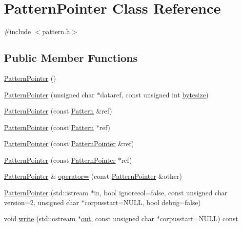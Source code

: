\hypertarget{classPatternPointer}{}\section{Pattern\+Pointer Class Reference}
\label{classPatternPointer}


{\ttfamily \#include $<$pattern.\+h$>$}

\subsection*{Public Member Functions}
\begin{DoxyCompactItemize}
\item 
\hyperlink{classPatternPointer_a381ac2ccc5d5f93a4455a1b2872d3d6e}{Pattern\+Pointer} ()
\item 
\hyperlink{classPatternPointer_aa647a834df48ed926690ddc19490d531}{Pattern\+Pointer} (unsigned char $\ast$dataref, const unsigned int \hyperlink{classPatternPointer_a8a204b408ed1cccc3b0c89183e818210}{bytesize})
\item 
\hyperlink{classPatternPointer_a8c1e78640412744a1f9411b937a4a6a5}{Pattern\+Pointer} (const \hyperlink{classPattern}{Pattern} \&ref)
\item 
\hyperlink{classPatternPointer_a5eb9e3fcab5a8551cdce0283fe944ea8}{Pattern\+Pointer} (const \hyperlink{classPattern}{Pattern} $\ast$ref)
\item 
\hyperlink{classPatternPointer_a39eb71907e688b7b459b56806d8053e4}{Pattern\+Pointer} (const \hyperlink{classPatternPointer}{Pattern\+Pointer} \&ref)
\item 
\hyperlink{classPatternPointer_a9aba9dd0c20350ae03814d962cd1dad3}{Pattern\+Pointer} (const \hyperlink{classPatternPointer}{Pattern\+Pointer} $\ast$ref)
\item 
\hyperlink{classPatternPointer}{Pattern\+Pointer} \& \hyperlink{classPatternPointer_a578fae25bee65ed0211a06f4101795f4}{operator=} (const \hyperlink{classPatternPointer}{Pattern\+Pointer} \&other)
\item 
\hyperlink{classPatternPointer_aa8eb02907db90afc9decd7b44e54b6c5}{Pattern\+Pointer} (std\+::istream $\ast$in, bool ignoreeol=false, const unsigned char version=2, unsigned char $\ast$corpusstart=N\+U\+L\+L, bool debug=false)
\item 
void \hyperlink{classPatternPointer_ace0bd6e4b893a9ecd205e08a88490b6d}{write} (std\+::ostream $\ast$\hyperlink{classPatternPointer_a281b6877995271a87cf561c450c4421b}{out}, const unsigned char $\ast$corpusstart=N\+U\+L\+L) const 

\end{DoxyCompactItemize}
